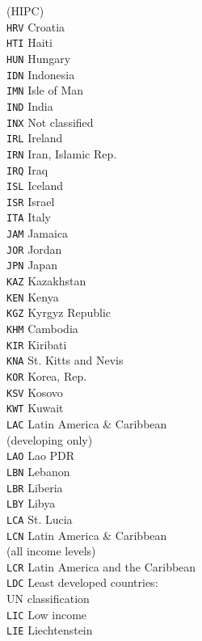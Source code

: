 \begin{multicols}{3}
{(HIPC)\\
\texttt{HRV}	Croatia\\
\texttt{HTI}	Haiti\\
\texttt{HUN}	Hungary\\
\texttt{IDN}	Indonesia\\
\texttt{IMN}	Isle of Man\\
\texttt{IND}	India\\
\texttt{INX}	Not classified\\
\texttt{IRL}	Ireland\\
\texttt{IRN}	Iran, Islamic Rep.\\
\texttt{IRQ}	Iraq\\
\texttt{ISL}	Iceland\\
\texttt{ISR}	Israel\\
\texttt{ITA}	Italy\\
\texttt{JAM}	Jamaica\\
\texttt{JOR}	Jordan\\
\texttt{JPN}	Japan\\
\texttt{KAZ}	Kazakhstan\\
\texttt{KEN}	Kenya\\
\texttt{KGZ}	Kyrgyz Republic\\
\texttt{KHM}	Cambodia\\
\texttt{KIR}	Kiribati\\
\texttt{KNA}	St. Kitts and Nevis\\
\texttt{KOR}	Korea, Rep.\\
\texttt{KSV}	Kosovo\\
\texttt{KWT}	Kuwait\\
\texttt{LAC}	Latin America \& Caribbean\\
(developing only)\\
\texttt{LAO}	Lao PDR\\
\texttt{LBN}	Lebanon\\
\texttt{LBR}	Liberia\\
\texttt{LBY}	Libya\\
\texttt{LCA}	St. Lucia\\
\texttt{LCN}	Latin America \& Caribbean\\
(all income levels)\\
\texttt{LCR}	Latin America and the Caribbean\\
\texttt{LDC}	Least developed countries: \\
UN classification\\
\texttt{LIC}	Low income\\
\texttt{LIE}	Liechtenstein\\
}
\end{multicols}
